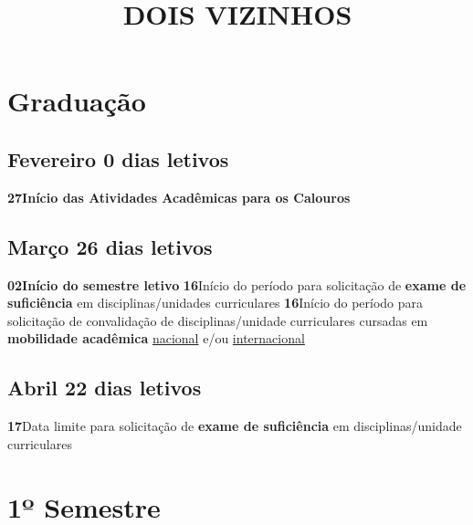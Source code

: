 \documentclass[thesis]{hmcposter}
\author{ }
\title{DOIS VIZINHOS}
\begin{document}
\begin{poster}
\normalsize\section{\color{hmcorange}Graduação}\subsection{Fevereiro \hfill 0 dias letivos}\textbf{27}\qquad \textbf{Início das Atividades Acadêmicas para os Calouros} \newline \null\subsection{Março \hfill 26 dias letivos}\textbf{02}\qquad \textbf{Início do semestre letivo} \newline \null\textbf{16}\qquad Início do período para solicitação de \textbf{exame de suficiência} em disciplinas/unidades curriculares \newline \null\textbf{16}\qquad Início do período para solicitação de convalidação de disciplinas/unidade curriculares cursadas em \textbf{mobilidade acadêmica} \underline{nacional} e/ou \underline{internacional} \newline \null\subsection{Abril \hfill 22 dias letivos}\textbf{17}\qquad Data limite para solicitação de \textbf{exame de suficiência} em disciplinas/unidade curriculares \newline \null\vfill\null
\columnbreak
\section{\hfill \color{hmcorange}1º Semestre}

\end{poster}
\end{document}

